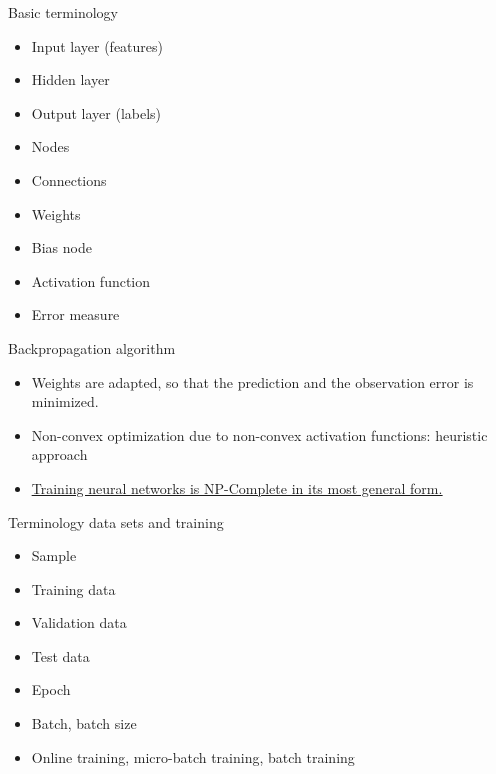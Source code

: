 \documentclass[color=usenames,dvipsnames]{beamer}
\begin{document}
\begin{frame}{Basic terminology} 

\begin{itemize}
	\item Input layer (features)
	\item Hidden layer
	\item Output layer (labels)
	\item Nodes
	\item Connections
	\item Weights
	\item Bias node
	\item Activation function
	\item Error measure
\end{itemize}

\end{frame}





\begin{frame}{Backpropagation algorithm} 

\begin{itemize}
	\item Weights are adapted, so that the prediction and the observation error is minimized.\\
	\item Non-convex optimization due to non-convex activation functions: heuristic approach\\
	\item \href{https://page.mi.fu-berlin.de/rojas/neural/chapter/K10.pdf}{\underline{Training neural networks is NP-Complete in its most general form.}}\\

\end{itemize}

\end{frame}

\begin{frame}{Terminology data sets and training} 

\begin{itemize}
	\item Sample
	\item Training data
	\item Validation data 
	\item Test data
	\item Epoch
	\item Batch, batch size
	\item Online training, micro-batch training, batch training
\end{itemize}

\end{frame}
\end{document}
